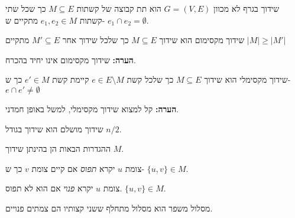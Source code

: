 \begin{definition}[שידוך]
שידוך בגרף לא מכוון
$G = (V, E)$
הוא תת קבוצה של קשתות 
$M \subseteq E$
כך שכל שתי קשתות
$e_1, e_2 \in M$
מתקיים ש-
$e_1 \cap e_2 = \emptyset$.
\end{definition}

\begin{definition}
שידוך מקסימום הוא שידוך 
$M \subseteq E$
כך שלכל שידוך אחר
$M' \subseteq E$
מתקיים
$|M| \geq |M'|$
\end{definition}

\textbf{הערה:}
שידוך מקסימום אינו יחיד בהכרח.

\begin{definition}
שידוך מקסימלי הוא שידוך 
$M \subseteq E$
כך שלכל קשת 
$e \in E \setminus M$
קיימת קשת 
$e' \in M$
כך ש-
$e \cap e' \neq \emptyset$
\end{definition}

\textbf{הערה:}
קל למצוא שידוך מקסימלי, למשל באופן חמדני.

\begin{definition}
שידוך מושלם הוא שידוך בגודל 
$n/2$.
\end{definition}

ההגדרות הבאות הן בהינתן שידוך $M$.
\begin{definition}
צומת $u$ יקרא
\emph{תפוס}
אם קיים צומת $v$ כך ש-
$\{u, v\} \in M$.
\end{definition}

\begin{definition}
צומת $u$ יקרא
\emph{פנוי}
אם הוא לא תפוס.
$\{u, v\} \in M$.
\end{definition}

\begin{definition}[מסלול מתחלף]
מסלול (פשוט) 
$(v_1, \ldots, v_l)$
יקרא
\emph{מתחלף}
אם לכל 
$1 \leq i < l$
מתקיים ש-
$|\{e_i, e_{i + 1}}\} \cap M| = 1$
כאשר
$e_i = \{v_i, v_{i + 1}\}$.
\end{definition}

\begin{definition}
מסלול משפר הוא מסלול מתחלף ששני קצותיו הם צמתים פנויים.
\end{definition}

